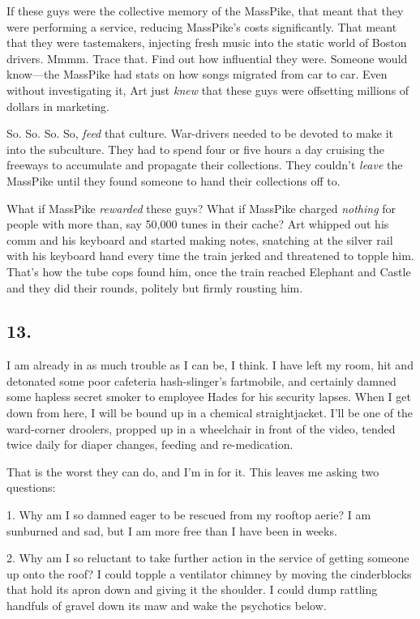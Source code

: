 If these guys were the collective memory of the MassPike, that
meant that they were performing a service, reducing MassPike’s
costs significantly. That meant that they were tastemakers,
injecting fresh music into the static world of Boston drivers.
Mmmm. Trace that. Find out how influential they were. Someone would
know—the MassPike had stats on how songs migrated from car to car.
Even without investigating it, Art just \emph{knew} that these guys
were offsetting millions of dollars in marketing.

So. So. So. So, \emph{feed} that culture. War-drivers needed to be
devoted to make it into the subculture. They had to spend four or
five hours a day cruising the freeways to accumulate and propagate
their collections. They couldn’t \emph{leave} the MassPike until
they found someone to hand their collections off to.

What if MassPike \emph{rewarded} these guys? What if MassPike
charged \emph{nothing} for people with more than, say 50,000 tunes
in their cache? Art whipped out his comm and his keyboard and
started making notes, snatching at the silver rail with his
keyboard hand every time the train jerked and threatened to topple
him. That’s how the tube cops found him, once the train reached
Elephant and Castle and they did their rounds, politely but firmly
rousting him.

\subsection{13.}

I am already in as much trouble as I can be, I think. I have left
my room, hit and detonated some poor cafeteria hash-slinger’s
fartmobile, and certainly damned some hapless secret smoker to
employee Hades for his security lapses. When I get down from here,
I will be bound up in a chemical straightjacket. I’ll be one of the
ward-corner droolers, propped up in a wheelchair in front of the
video, tended twice daily for diaper changes, feeding and
re-medication.

That is the worst they can do, and I’m in for it. This leaves me
asking two questions:

1. Why am I so damned eager to be rescued from my rooftop aerie? I
am sunburned and sad, but I am more free than I have been in
weeks.

2. Why am I so reluctant to take further action in the service of
getting someone up onto the roof? I could topple a ventilator
chimney by moving the cinderblocks that hold its apron down and
giving it the shoulder. I could dump rattling handfuls of gravel
down its maw and wake the psychotics below.


